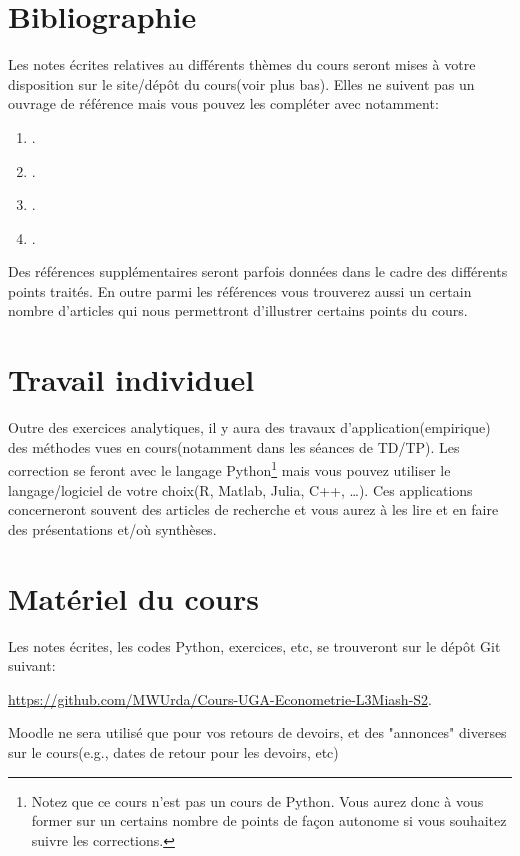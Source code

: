 \section{Bibliographie}

Les notes écrites relatives au différents thèmes du cours seront mises à votre disposition sur le site/dépôt du cours(voir plus bas).
Elles ne suivent pas un ouvrage de référence mais vous pouvez les compléter avec  notamment:
\begin{enumerate}[-]
\item \cite{Amemiya1985}.
\item \cite{ap2009}.
\item \cite{Hansen2017}.
\item \cite{Wooldridge2010}.
\end{enumerate}
Des références supplémentaires seront parfois données dans le cadre des différents points traités.
En outre parmi les références vous trouverez aussi un certain nombre d'articles qui nous 
permettront d'illustrer certains points du cours. 


\section{Travail individuel}
Outre des exercices analytiques, il y aura des travaux d'application(empirique) des méthodes 
vues en cours(notamment dans les séances de TD/TP). Les correction se feront avec le langage 
Python\footnote{Notez que ce cours n'est pas un cours de Python. Vous aurez donc à vous former sur un certains nombre de points 
de façon autonome si vous souhaitez suivre les corrections.} mais vous pouvez utiliser 
le langage/logiciel de votre choix(R, Matlab, Julia, C++, \ldots). Ces applications concerneront souvent 
des articles de recherche et vous aurez à les lire et en faire des présentations et/où synthèses.

\section{Matériel du cours}

Les notes écrites, les codes Python, exercices, etc, se trouveront sur le dépôt Git suivant:

\url{https://github.com/MWUrda/Cours-UGA-Econometrie-L3Miash-S2}.

Moodle ne sera utilisé que pour vos retours de devoirs, et des "annonces" diverses sur le cours(e.g., dates de retour pour les devoirs, etc)


 
